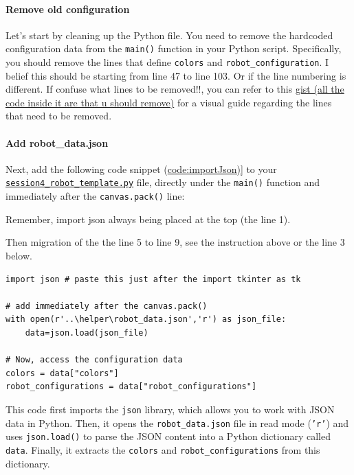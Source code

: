 \paragraph{Remove old configuration}
Let's start by cleaning up the Python file. You need to remove the hardcoded configuration data from the \texttt{main()} function in your Python script. Specifically, you should remove the lines that define \texttt{colors} and \texttt{robot\_configuration}. I belief this should be starting from line 47 to line 103. Or if the line numbering is different. If confuse what lines to be removed!!, you can refer to this \href{https://github.com/balandongiv/computer_programming_gist/blob/main/session4/prune_out_setting.py}{gist (all the code inside it are that u should remove)} for a visual guide regarding  the lines that need to be removed.


\paragraph{Add robot\_data.json}

Next, add the following code snippet (\href{https://github.com/balandongiv/computer_programming_gist/blob/main/session4/import_json.py}{code:importJson)}] to your \href{https://github.com/balandongiv/computer_programming_gist/blob/main/session4/session4_robot_template.py}{\texttt{session4\_robot\_template.py}} file, directly under the \texttt{main()} function and immediately after the \texttt{canvas.pack()} line:

Remember, import json always being placed at the top (the line 1).

Then migration of the the line 5 to line 9, see the instruction above or the line 3 below.

\begin{verbatim}
import json # paste this just after the import tkinter as tk

# add immediately after the canvas.pack()
with open(r'..\helper\robot_data.json','r') as json_file:
    data=json.load(json_file)

# Now, access the configuration data
colors = data["colors"]
robot_configurations = data["robot_configurations"]
\end{verbatim}

This code first imports the \texttt{json} library, which allows you to work with JSON data in Python. Then, it opens the \texttt{robot\_data.json} file in read mode (\texttt{'r'}) and uses \texttt{json.load()} to parse the JSON content into a Python dictionary called \texttt{data}. Finally, it extracts the \texttt{colors} and \texttt{robot\_configurations} from this dictionary.


